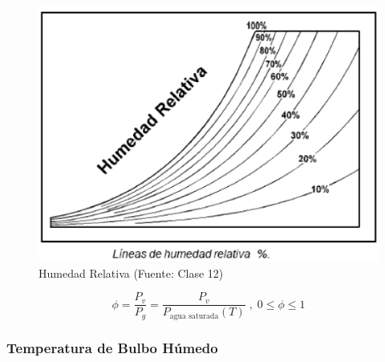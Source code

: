         \begin{multicols}{2}
            \begin{figure}
                \includegraphics[width=\textwidth]{img/clases/humedad_relativa.png}
                \caption{Humedad Relativa (Fuente: Clase 12)}
                \label{fig:humedad_relativa}
            \end{figure}
            
            \begin{quote}
            \end{quote}
            
            \[\phi=\frac{P_{v}}{P_{g}}=\frac{P_{v}}{P_{\text{agua saturada}}(T)}\;,\;0 \leq \phi \leq 1\]
        \end{multicols}
        
        \subsubsection{Temperatura de Bulbo Húmedo}
        
